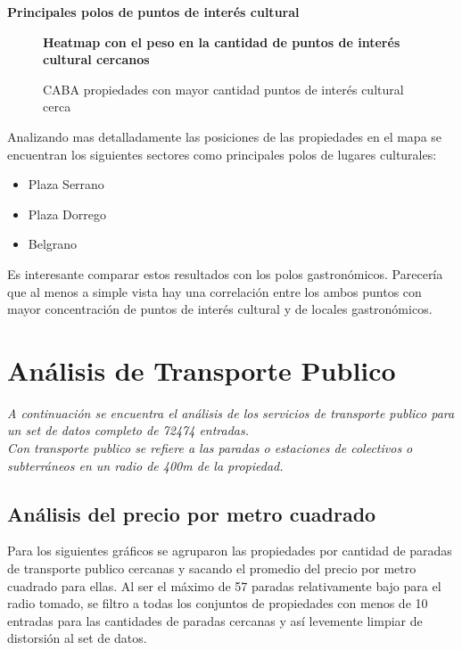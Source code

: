 \documentclass[a4paper, 10pt]{article}
\begin{document}
				\textbf{Principales polos de puntos de interés cultural}
				
				\begin{figure}
    				\centering
    				\textbf{Heatmap con el peso en la cantidad de puntos de interés cultural cercanos}\par\medskip
    				\caption{CABA propiedades con mayor cantidad puntos de interés cultural cerca}
				\end{figure}				
				\FloatBarrier
				
				Analizando mas detalladamente las posiciones de las propiedades en el mapa se encuentran 
				los siguientes sectores como principales polos de lugares culturales:
				
				\begin{itemize}
					\item Plaza Serrano
					\item Plaza Dorrego
					\item Belgrano
				\end{itemize}

				Es interesante comparar estos resultados con los polos gastronómicos. 
				Parecería que al menos a simple vista hay una correlación entre los 
				ambos puntos con mayor concentración de puntos de interés cultural y de locales gastronómicos. 
		
		\section{Análisis de Transporte Publico}
			\emph{A continuación se encuentra el análisis de los servicios de transporte publico para un 
			set de datos completo de 72474 entradas.\\
			Con transporte publico se refiere a las paradas o estaciones de colectivos o 
			subterráneos en un radio de 400m de la propiedad.} 												
			\subsection{Análisis del precio por metro cuadrado}
				Para los siguientes gráficos se agruparon las propiedades por cantidad de paradas de 
				transporte publico cercanas y sacando el promedio del precio por metro cuadrado para 
				ellas. Al ser el máximo de 57 paradas relativamente bajo para el radio tomado, 
				se filtro a todas los conjuntos de propiedades con menos de 10 entradas para las 
				cantidades de paradas cercanas y así levemente limpiar de distorsión al set de datos.
				 		
\end{document}
